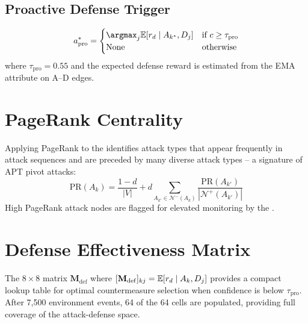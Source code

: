 \subsection{Proactive Defense Trigger}
\begin{equation}
  a^*_{\mathrm{pro}} = \begin{cases}
    \argmax_j \E[r_d \mid A_{k^*}, D_j] & \text{if } c \geq \tau_{\mathrm{pro}} \\
    \text{None} & \text{otherwise}
  \end{cases}
\end{equation}
where $\tau_{\mathrm{pro}} = 0.55$ and the expected defense reward
is estimated from the EMA attribute on A--D edges.

\section{PageRank Centrality}

Applying PageRank to the \tagraph{} identifies attack types that appear
frequently in attack sequences and are preceded by many diverse attack
types -- a signature of APT pivot attacks:
\begin{equation}
  \mathrm{PR}(A_k) = \frac{1-d}{|V|} + d \sum_{A_{k'} \in \mathcal{N}^-(A_k)}
    \frac{\mathrm{PR}(A_{k'})}{|\mathcal{N}^+(A_{k'})|}
\end{equation}
High PageRank attack nodes are flagged for elevated monitoring by the \arl{}.

\section{Defense Effectiveness Matrix}

The $8 \times 8$ matrix $\mathbf{M}_{\mathrm{def}}$ where
$[\mathbf{M}_{\mathrm{def}}]_{kj} = \mathbb{E}[r_d \mid A_k, D_j]$
provides a compact lookup table for optimal countermeasure selection
when confidence is below $\tau_{\mathrm{pro}}$.
After 7,500 environment events, 64 of the 64 cells are populated,
providing full coverage of the attack-defense space.
